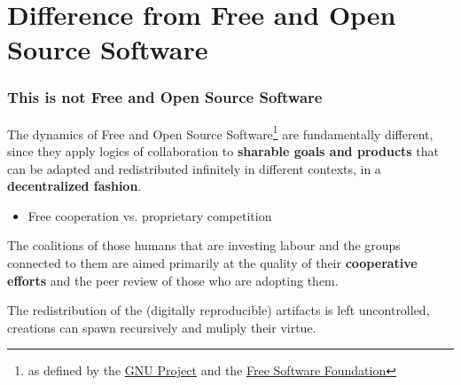 \documentclass{beamer}
\begin{document}
\section{Difference from Free and Open Source Software}
\label{sec-7}
\begin{frame}
\frametitle{This is not Free and Open Source Software}
\label{sec-7_1}


The dynamics of Free and Open Source Software\footnote{as defined by the \href{http://gnu.org}{GNU Project} and the \href{http://fsf.org}{Free Software Foundation} } are
fundamentally different, since they apply logics of collaboration to
\textbf{sharable goals and products} that can be adapted and redistributed
infinitely in different contexts, in a \textbf{decentralized fashion}.

\begin{itemize}
\item Free cooperation vs. proprietary competition
\end{itemize}


The coalitions of those humans that are investing labour and the
groups connected to them are aimed primarily at the quality of their
\textbf{cooperative efforts} and the peer review of those who are adopting
them.

The redistribution of the (digitally reproducible) artifacts is left
uncontrolled, creations can spawn recursively and muliply their
virtue.
\end{frame}
\end{document}
